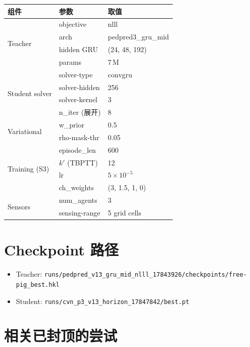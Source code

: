 \documentclass[11pt,a4paper]{ctexart}
\begin{document}
\begin{center}
\begin{tabular}{lll}
\toprule
组件 & 参数 & 取值 \\
\midrule
\multirow{4}{*}{Teacher} & objective & nlll \\
                         & arch     & pedpred3\_gru\_mid \\
                         & hidden GRU & (24, 48, 192) \\
                         & params   & 7\,M \\
\midrule
\multirow{4}{*}{Student solver} & solver-type & convgru \\
                                & solver-hidden & 256 \\
                                & solver-kernel & 3 \\
                                & n\_iter (展开) & 8 \\
\midrule
\multirow{2}{*}{Variational}  & w\_prior   & 0.5 \\
                              & rho-mask-thr & 0.05 \\
\midrule
\multirow{4}{*}{Training (S3)} & episode\_len & 600 \\
                               & $k'$ (TBPTT) & 12 \\
                               & lr           & $5\times 10^{-5}$ \\
                               & ch\_weights  & (3, 1.5, 1, 0) \\
\midrule
\multirow{2}{*}{Sensors} & num\_agents     & 3 \\
                         & sensing-range   & 5 grid cells \\
\bottomrule
\end{tabular}
\end{center}

\section{Checkpoint 路径}

\begin{itemize}
  \item Teacher: \texttt{runs/pedpred\_v13\_gru\_mid\_nlll\_17843926/checkpoints/free-pig\_best.hkl}
  \item Student: \texttt{runs/cvn\_p3\_v13\_horizon\_17847842/best.pt}
\end{itemize}

\section{相关已封顶的尝试}
\end{document}
